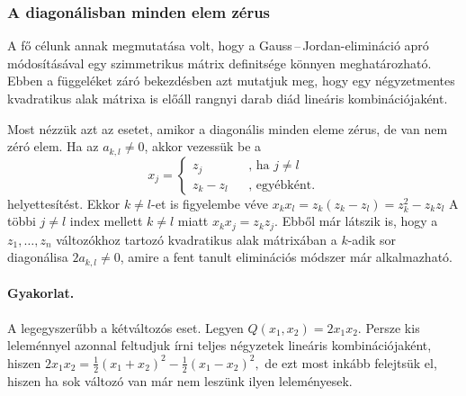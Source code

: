 \documentclass[a4paper, showtrims]{memoir}
\theoremstyle{plain}
\theoremstyle{remark}
\theoremstyle{definition}
\begin{document}
\subsubsection{A diagonálisban minden elem zérus}
A fő célunk annak megmutatása volt, hogy a 
Gauss\,--\,Jordan-elimináció apró módosításával egy szimmetrikus mátrix definitsége 
könnyen meghatározható.
Ebben a függeléket záró bekezdésben azt mutatjuk meg, 
hogy egy négyzetmentes kvadratikus alak mátrixa is előáll rangnyi darab diád lineáris kombinációjaként.

Most nézzük azt az esetet, amikor a diagonális minden eleme zérus, de van nem zéró elem.
Ha az $a_{k,l}\neq 0$, akkor vezessük be a 
\begin{equation}
    \label{eq:substitution}
    x_j=\left\{
        \begin{matrix}
            z_j&&\text{, ha }j\neq l\\
            z_k-z_l&&\text{, egyébként.}
        \end{matrix}
        \right.
\end{equation}
helyettesítést.
Ekkor $k\neq l$-et is figyelembe véve
\(
x_kx_l=z_k\left( z_k-z_l \right)=z_k^2-z_kz_l
\)
A többi $j\neq l$ index mellett $k\neq l$ miatt
\(
x_kx_j=z_kz_j.
\)
Ebből már látszik is, 
hogy a $z_1,\dots,z_n$ változókhoz tartozó kvadratikus alak mátrixában a $k$-adik sor diagonálisa
$2a_{k,l}\neq 0$, amire a fent tanult eliminációs módszer már alkalmazható.
\paragraph{Gyakorlat.} 
A legegyszerűbb a kétváltozós eset. Legyen 
\(
Q\left( x_1,x_2 \right)=2x_1x_2.
\)
Persze kis leleménnyel azonnal feltudjuk írni teljes négyzetek lineáris kombinációjaként,
hiszen 
\(
2x_1x_2
=\frac{1}{2}\left( x_1+x_2 \right)^2
-
\frac{1}{2}\left( x_1-x_2 \right)^2,
\)
de ezt most inkább felejtsük el, hiszen ha sok változó van már nem leszünk ilyen leleményesek.
\end{document}
